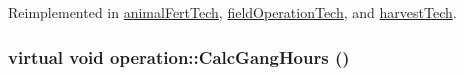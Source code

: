 Reimplemented in \hyperlink{classanimal_fert_tech_a3847a22b473b9a09f5e524c165ae0484}{animalFertTech}, \hyperlink{classfield_operation_tech_a530d49b4cf06668121b80eba679b7e98}{fieldOperationTech}, and \hyperlink{classharvest_tech_a7da76cf91a1af094816d27b373e7f913}{harvestTech}.\hypertarget{classoperation_a51c5612f29519bc82050ffccf089bc07}{
\subsubsection[{CalcGangHours}]{\setlength{\rightskip}{0pt plus 5cm}virtual void operation::CalcGangHours ()}}
\label{classoperation_a51c5612f29519bc82050ffccf089bc07}



